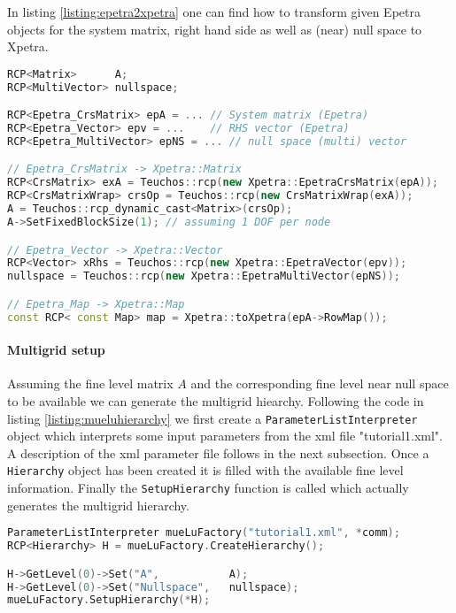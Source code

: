 \documentclass[12pt,a4paper]{article}
\newcommand{\Xpetra}{Xpetra}
\begin{document}
In listing \ref{listing:epetra2xpetra} one can find how to transform given Epetra objects for the system matrix, right hand side as well as (near) null space to \Xpetra.
\begin{Listing} 
\begin{center} 
\begin{lstlisting}[language=C++,label=listing:epetra2xpetra]
RCP<Matrix>      A;
RCP<MultiVector> nullspace;

RCP<Epetra_CrsMatrix> epA = ... // System matrix (Epetra)
RCP<Epetra_Vector> epv = ...    // RHS vector (Epetra)
RCP<Epetra_MultiVector> epNS = ... // null space (multi) vector

// Epetra_CrsMatrix -> Xpetra::Matrix
RCP<CrsMatrix> exA = Teuchos::rcp(new Xpetra::EpetraCrsMatrix(epA));
RCP<CrsMatrixWrap> crsOp = Teuchos::rcp(new CrsMatrixWrap(exA));
A = Teuchos::rcp_dynamic_cast<Matrix>(crsOp);
A->SetFixedBlockSize(1); // assuming 1 DOF per node

// Epetra_Vector -> Xpetra::Vector
RCP<Vector> xRhs = Teuchos::rcp(new Xpetra::EpetraVector(epv));
nullspace = Teuchos::rcp(new Xpetra::EpetraMultiVector(epNS));

// Epetra_Map -> Xpetra::Map
const RCP< const Map> map = Xpetra::toXpetra(epA->RowMap());
\end{lstlisting}
\caption{Generate Xpetra objects from Epetra objects.} 
\label{listing:epetra2xpetra}
\end{center}
\end{Listing}

\paragraph{Multigrid setup}
Assuming the fine level matrix $A$ and the corresponding fine level near null space to be available we can generate the multigrid hiearchy. Following the code in listing \ref{listing:mueluhierarchy} we first create a \verb|ParameterListInterpreter| object which interprets some input parameters from the xml file "tutorial1.xml". A description of the xml parameter file follows in the next subsection.
Once a \verb|Hierarchy| object has been created it is filled with the available fine level information. Finally the \verb|SetupHierarchy| function is called which actually generates the multigrid hierarchy.
\begin{Listing} 
\begin{center} 
\begin{lstlisting}[language=C++,label=listing:epetra2xpetra]
ParameterListInterpreter mueLuFactory("tutorial1.xml", *comm);
RCP<Hierarchy> H = mueLuFactory.CreateHierarchy();

H->GetLevel(0)->Set("A",           A);
H->GetLevel(0)->Set("Nullspace",   nullspace);
mueLuFactory.SetupHierarchy(*H);
\end{lstlisting}
\caption{Build multigrid hierarchy} 
\label{listing:mueluhierarchy}
\end{center}
\end{Listing}
\end{document}
